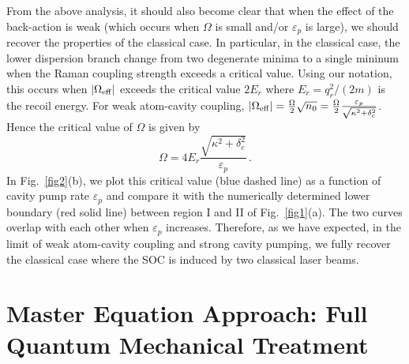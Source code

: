 \documentclass[atoms,article,submit,moreauthors,pdftex,12pt,a4paper]{mdpi}
\begin{document}
From the above analysis, it should also become clear that when the effect of the back-action is weak (which occurs when $\Omega$ is small and/or $\varepsilon_p$ is large), we should recover the properties of the classical case. In particular, in the classical case, the lower dispersion branch change from two degenerate minima to a single mininum when the Raman coupling strength exceeds a critical value. Using our notation, this occurs when $|\Omega_{\rm eff}|$ exceeds the critical value $2E_r$ where $E_r=q_r^2/(2m)$ is the recoil energy. For weak atom-cavity coupling, $|\Omega_{\rm eff}| =\frac{ \Omega}{2} \sqrt{n_0}=\frac{\Omega}{2}  \frac{\varepsilon_p}{\sqrt{\kappa^2+ \delta_c^2}}$. Hence the critical value of $\Omega$ is given by 
\begin{equation}
\Omega=4E_r\frac{\sqrt{\kappa^2+\delta_c^2}}{\varepsilon_p}\,.
\label{ome}
\end{equation}
In Fig.~\ref{fig2}(b), we plot this critical value (blue dashed line) as a function of cavity pump rate $\varepsilon_p$ and compare it with the numerically determined lower boundary (red solid line) between region I and II of Fig.~\ref{fig1}(a). The two curves overlap with each other when $\varepsilon_p$ increases. Therefore, as we have expected, in the limit of weak atom-cavity coupling and strong cavity pumping, we fully recover the classical case where the SOC is induced by two classical laser beams.     


\section{Master Equation Approach: Full Quantum Mechanical Treatment } \label{master}
\end{document}
